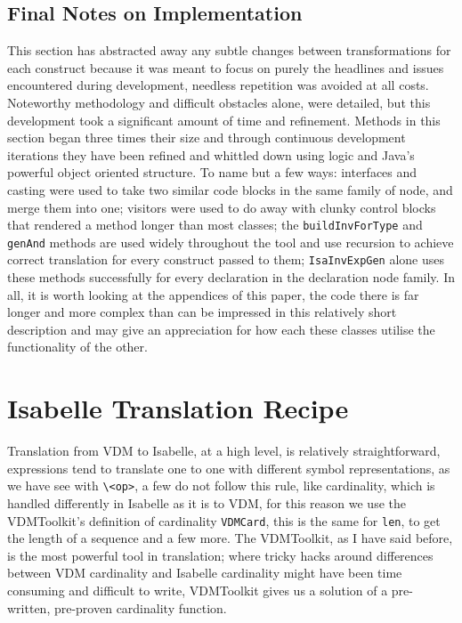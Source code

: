 	\subsection{Final Notes on Implementation}
	This section has abstracted away any subtle changes between transformations for each construct because it was meant to focus on purely the headlines and issues encountered during development, needless repetition was avoided at all costs. Noteworthy methodology and difficult obstacles alone, were detailed, but this development took a significant amount of time and refinement. Methods in this section began three times their size and through continuous development iterations they have been refined and whittled down using logic and Java's powerful object oriented structure. To name but a few ways: interfaces and casting were used to take two similar code blocks in the same family of node, and merge them into one; visitors were used to do away with clunky control blocks that rendered a method longer than most classes; the \lstinline[language=Java]{buildInvForType} and \lstinline[language=Java]{genAnd} methods are used widely throughout the tool and use recursion to achieve correct translation for every construct passed to them; \lstinline[language=Java]{IsaInvExpGen} alone uses these methods successfully for every declaration in the declaration node family. In all, it is worth looking at the appendices of this paper, the code there is far longer and more complex than can be impressed in this relatively short description and may give an appreciation for how each these classes utilise the functionality of the other. 

	\section{Isabelle Translation Recipe}
	Translation from VDM to Isabelle, at a high level, is relatively straightforward, expressions tend to translate one to one with different symbol representations, as we have see with \lstinline[language=Isabelle]{\<op>}, a few do not follow this rule, like cardinality, which is handled differently in Isabelle as it is to VDM, for this reason we use the VDMToolkit's definition of cardinality \lstinline[language=Java]{VDMCard}, this is the same for \lstinline[language=Java]{len}, to get the length of a sequence and a few more. The VDMToolkit, as I have said before, is the most powerful tool in translation; where tricky hacks around differences between VDM cardinality and Isabelle cardinality might have been time consuming and difficult to write, VDMToolkit gives us a solution of a pre-written, pre-proven cardinality function.

